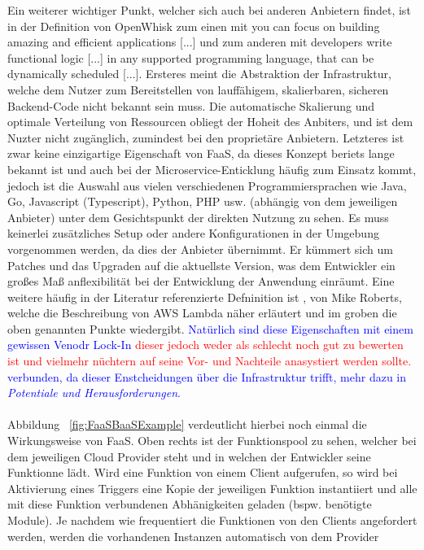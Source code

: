 \documentclass[11pt]{article}
\begin{document}
Ein weiterer wichtiger Punkt, welcher sich auch bei anderen Anbietern findet, ist in der Definition von OpenWhisk zum einen mit \glqq[...] you can focus on building amazing and efficient applications [...]\grqq{} und zum anderen mit \glqq  developers write functional logic [...] in any supported programming language, that can be dynamically scheduled [...]\grqq{}\cite{apache2020OpenWhisk}. Ersteres meint die Abstraktion der Infrastruktur, welche dem Nutzer zum Bereitstellen von lauffähigem, skalierbaren, sicheren Backend-Code nicht bekannt sein muss. Die automatische Skalierung und optimale Verteilung von Ressourcen obliegt der Hoheit des Anbiters, und ist dem Nuzter nicht zugänglich, zumindest bei den proprietäre Anbietern. Letzteres ist zwar keine einzigartige Eigenschaft von FaaS, da dieses Konzept beriets lange bekannt ist und auch bei der Microservice-Enticklung häufig zum Einsatz kommt, jedoch ist die Auswahl aus vielen verschiedenen Programmiersprachen wie Java, Go, Javascript (Typescript), Python, PHP usw. (abhängig von dem jeweiligen Anbieter) unter dem Gesichtspunkt der direkten Nutzung zu sehen. Es muss keinerlei zusätzliches Setup oder andere Konfigurationen in der Umgebung vorgenommen werden, da dies der Anbieter übernimmt. Er kümmert sich um Patches und das Upgraden auf die aktuellste Version, was dem Entwickler ein großes Maß anflexibilität bei der Entwicklung der Anwendung einräumt. Eine weitere häufig in der Literatur referenzierte Defninition ist \cite{fowler2018serverless}, von Mike Roberts, welche die Beschreibung von AWS Lambda näher erläutert und im groben die oben genannten Punkte wiedergibt. \textcolor{blue}{Natürlich sind diese Eigenschaften mit einem gewissen Venodr Lock-In \textcolor{red}{dieser jedoch weder als schlecht noch gut zu bewerten ist und vielmehr nüchtern auf seine Vor- und Nachteile anasystiert werden sollte.} verbunden, da dieser Enstcheidungen über die Infrastruktur trifft, mehr dazu in \textit{Potentiale und Herausforderungen}.}\\\\
Abbildung ~\ref{fig:FaaSBaaSExample} verdeutlicht hierbei noch einmal die Wirkungsweise von FaaS. Oben rechts ist der Funktionspool zu sehen, welcher bei dem jeweiligen Cloud Provider steht und in welchen der Entwickler seine Funktionne lädt. Wird eine Funktion von einem Client aufgerufen, so wird bei Aktivierung eines Triggers eine Kopie der jeweiligen Funktion instantiiert und alle mit diese Funktion verbundenen Abhänigkeiten geladen (bspw. benötigte Module). Je nachdem wie frequentiert die Funktionen von den Clients angefordert werden, werden die vorhandenen Instanzen automatisch von dem Provider 
\end{document}
